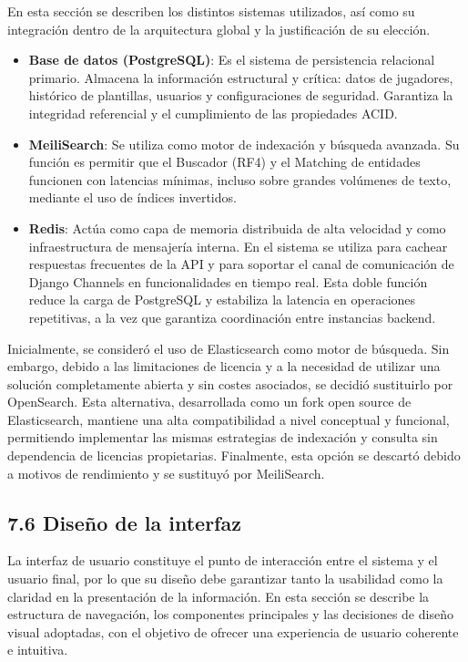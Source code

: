 En esta sección se describen los distintos sistemas utilizados, así como su
integración dentro de la arquitectura global y la justificación de su elección.
 
\begin{itemize}
\item \textbf{Base de datos (PostgreSQL)}: Es el sistema de persistencia
relacional primario. Almacena la información estructural y crítica: datos de
jugadores, histórico de plantillas, usuarios y configuraciones de seguridad.
Garantiza la integridad referencial y el cumplimiento de las propiedades ACID.
 
\item \textbf{MeiliSearch}: Se utiliza como motor de indexación y búsqueda
avanzada. Su función es permitir que el Buscador (RF4) y el Matching de
entidades funcionen con latencias mínimas, incluso sobre grandes volúmenes de
texto, mediante el uso de índices invertidos.
 
\item \textbf{Redis}: Actúa como capa de memoria distribuida de alta velocidad y
como infraestructura de mensajería interna. En el sistema se utiliza para
cachear respuestas frecuentes de la API y para soportar el canal de comunicación
de Django Channels en funcionalidades en tiempo real. Esta doble función reduce
la carga de PostgreSQL y estabiliza la latencia en operaciones repetitivas, a la
vez que garantiza coordinación entre instancias backend.
\end{itemize}
 
Inicialmente, se consideró el uso de Elasticsearch como motor de búsqueda. Sin
embargo, debido a las limitaciones de licencia y a la necesidad de utilizar una
solución completamente abierta y sin costes asociados, se decidió sustituirlo
por OpenSearch. Esta alternativa, desarrollada como un fork open source de
Elasticsearch, mantiene una alta compatibilidad a nivel conceptual y funcional,
permitiendo implementar las mismas estrategias de indexación y consulta sin
dependencia de licencias propietarias. Finalmente, esta opción se descartó debido
a motivos de rendimiento y se sustituyó por MeiliSearch.
 
\subsection{7.6 Diseño de la interfaz}
La interfaz de usuario constituye el punto de interacción entre el sistema y el
usuario final, por lo que su diseño debe garantizar tanto la usabilidad como la
claridad en la presentación de la información.
En esta sección se describe la estructura de navegación, los componentes
principales y las decisiones de diseño visual adoptadas, con el objetivo de
ofrecer una experiencia de usuario coherente e intuitiva.
 
